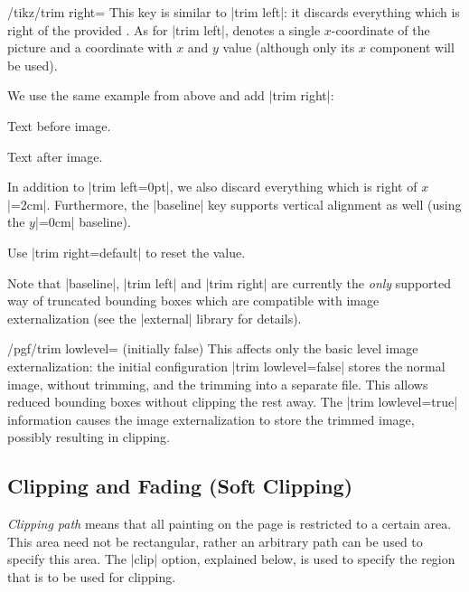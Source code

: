 \begin{key}{/tikz/trim right=}
    This key is similar to |trim left|: it discards everything which is right
    of the provided . As for |trim left|,
     denotes a single $x$-coordinate of the picture and
     a coordinate with $x$ and $y$ value (although only its
    $x$ component will be used).

    We use the same example from above and add |trim right|:
\begin{codeexample}[]
Text before image.%
Text after image.
\end{codeexample}
    In addition to |trim left=0pt|, we also discard everything which is right
    of $x$|=2cm|. Furthermore, the |baseline| key supports vertical alignment
    as well (using the $y$|=0cm| baseline).

    Use |trim right=default| to reset the value.
\end{key}

Note that |baseline|, |trim left| and |trim right| are currently the
\emph{only} supported way of truncated bounding boxes which are compatible with
image externalization (see the |external| library for details).

\begin{key}{/pgf/trim lowlevel= (initially false)}
    This affects only the basic level image externalization: the initial
    configuration |trim lowlevel=false| stores the normal image, without
    trimming, and the trimming into a separate file. This allows reduced
    bounding boxes without clipping the rest away. The |trim lowlevel=true|
    information causes the image externalization to store the trimmed image,
    possibly resulting in clipping.
\end{key}


\subsection{Clipping and Fading (Soft Clipping)}

\emph{Clipping path} means that all painting on the page is restricted to a
certain area. This area need not be rectangular, rather an arbitrary path can
be used to specify this area. The |clip| option, explained below, is used to
specify the region that is to be used for clipping.

